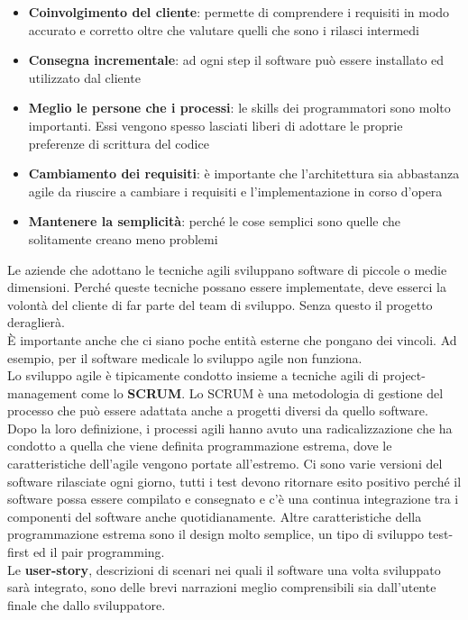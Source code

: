 \begin{itemize}[noitemsep]
    \item \textbf{Coinvolgimento del cliente}: permette di comprendere i requisiti in modo accurato e corretto oltre che valutare quelli che sono i rilasci intermedi
    \item \textbf{Consegna incrementale}: ad ogni step il software può essere installato ed utilizzato dal cliente
    \item \textbf{Meglio le persone che i processi}: le skills dei programmatori sono molto importanti. Essi vengono spesso lasciati liberi di adottare le proprie preferenze di scrittura del codice
    \item \textbf{Cambiamento dei requisiti}: è importante che l'architettura sia abbastanza agile da riuscire a cambiare i requisiti e l'implementazione in corso d'opera
    \item \textbf{Mantenere la semplicità}: perché le cose semplici sono quelle che solitamente creano meno problemi
\end{itemize}
Le aziende che adottano le tecniche agili sviluppano software di piccole o medie dimensioni.
Perché queste tecniche possano essere implementate, deve esserci la volontà del cliente di far parte del team di sviluppo.
Senza questo il progetto deraglierà.\\
È importante anche che ci siano poche entità esterne che pongano dei vincoli.
Ad esempio, per il software medicale lo sviluppo agile non funziona.\\
Lo sviluppo agile è tipicamente condotto insieme a tecniche agili di project-management come lo \textbf{SCRUM}.
Lo SCRUM è una metodologia di gestione del processo che può essere adattata anche a progetti diversi da quello software.\\
Dopo la loro definizione, i processi agili hanno avuto una radicalizzazione che ha condotto a quella che viene definita programmazione estrema, dove le caratteristiche dell'agile vengono portate all'estremo.
Ci sono varie versioni del software rilasciate ogni giorno, tutti i test devono ritornare esito positivo perché il software possa essere compilato e consegnato e c'è una continua integrazione tra i componenti del software anche quotidianamente.
Altre caratteristiche della programmazione estrema sono il design molto semplice, un tipo di sviluppo test-first ed il pair programming.\\
Le \textbf{user-story}, descrizioni di scenari nei quali il software una volta sviluppato sarà integrato, sono delle brevi narrazioni meglio comprensibili sia dall'utente finale che dallo sviluppatore.\\

